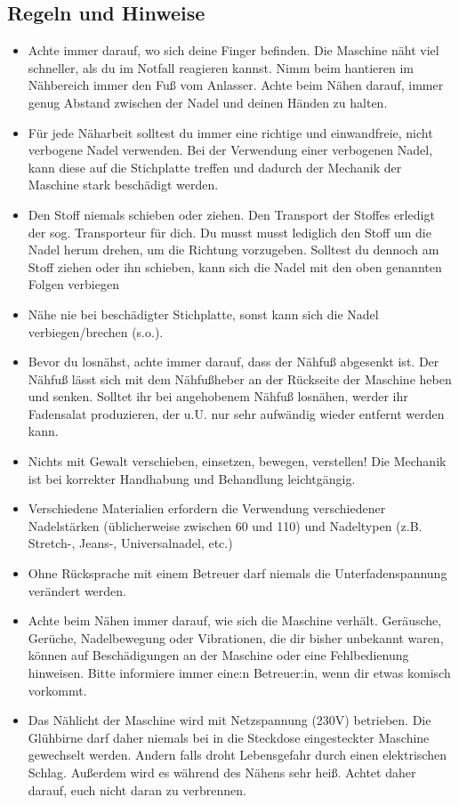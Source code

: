 \documentclass{\basedir/fablab-document}
\begin{document}
\pagebreak

\subsection{Regeln und Hinweise}
\begin{itemize}
	\item Achte immer darauf, wo sich deine Finger befinden. Die Maschine näht viel schneller, als du im Notfall reagieren kannst. Nimm beim hantieren im Nähbereich immer den Fuß vom Anlasser. Achte beim Nähen darauf, immer genug Abstand zwischen der Nadel und deinen Händen zu halten.
	\item Für jede Näharbeit solltest du immer eine richtige und einwandfreie, nicht verbogene Nadel verwenden. Bei der Verwendung einer verbogenen Nadel, kann diese auf die Stichplatte treffen und dadurch der Mechanik der Maschine stark beschädigt werden.
	\item Den Stoff niemals schieben oder ziehen. Den Transport der Stoffes erledigt der sog. Transporteur für dich. Du musst musst lediglich den Stoff um die Nadel herum drehen, um die Richtung vorzugeben. Solltest du dennoch am Stoff ziehen oder ihn schieben, kann sich die Nadel mit den oben genannten Folgen verbiegen
	\item Nähe nie bei beschädigter Stichplatte, sonst kann sich die Nadel verbiegen/brechen (s.o.).
	\item Bevor du losnähst, achte immer darauf, dass der Nähfuß abgesenkt ist. Der Nähfuß lässt sich mit dem Nähfußheber an der Rückseite der Maschine heben und senken. Solltet ihr bei angehobenem Nähfuß losnähen, werder ihr Fadensalat produzieren, der u.U. nur sehr aufwändig wieder entfernt werden kann.
	\item Nichts mit Gewalt verschieben, einsetzen, bewegen, verstellen! Die Mechanik ist bei korrekter Handhabung und Behandlung leichtgängig.
	\item Verschiedene Materialien erfordern die Verwendung verschiedener Nadelstärken (üblicherweise zwischen 60 und 110) und Nadeltypen (z.B. Stretch-, Jeans-,  Universalnadel, etc.)
	\item Ohne Rücksprache mit einem Betreuer darf niemals die Unterfadenspannung verändert werden.
	\item Achte beim Nähen immer darauf, wie sich die Maschine verhält. Geräusche, Gerüche, Nadelbewegung oder Vibrationen, die dir bisher unbekannt waren, können auf Beschädigungen an der Maschine oder eine Fehlbedienung hinweisen. Bitte informiere immer eine:n Betreuer:in, wenn dir etwas komisch vorkommt.
	\item Das Nählicht der Maschine wird mit Netzspannung (230V) betrieben. Die Glühbirne darf daher niemals bei in die Steckdose eingesteckter Maschine gewechselt werden. Andern falls droht Lebensgefahr durch einen elektrischen Schlag. Außerdem wird es während des Nähens sehr heiß. Achtet daher darauf, euch nicht daran zu verbrennen.
\end{itemize}
\end{document}
